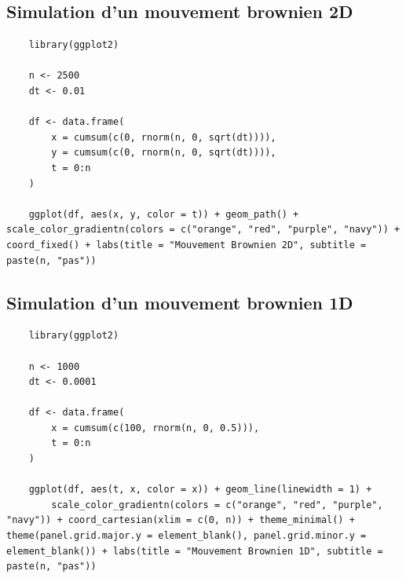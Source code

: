 \subsection*{Simulation d'un mouvement brownien 2D}
\begin{lstlisting}
    library(ggplot2)
    
    n <- 2500
    dt <- 0.01

    df <- data.frame(
        x = cumsum(c(0, rnorm(n, 0, sqrt(dt)))),
        y = cumsum(c(0, rnorm(n, 0, sqrt(dt)))),
        t = 0:n
    )

    ggplot(df, aes(x, y, color = t)) + geom_path() + scale_color_gradientn(colors = c("orange", "red", "purple", "navy")) + coord_fixed() + labs(title = "Mouvement Brownien 2D", subtitle = paste(n, "pas"))
\end{lstlisting}
\pagebreak
\subsection*{Simulation d'un mouvement brownien 1D}
\begin{lstlisting}
    library(ggplot2)
    
    n <- 1000 
    dt <- 0.0001 
    
    df <- data.frame(
        x = cumsum(c(100, rnorm(n, 0, 0.5))),
        t = 0:n
    )
    
    ggplot(df, aes(t, x, color = x)) + geom_line(linewidth = 1) + 
        scale_color_gradientn(colors = c("orange", "red", "purple", "navy")) + coord_cartesian(xlim = c(0, n)) + theme_minimal() + theme(panel.grid.major.y = element_blank(), panel.grid.minor.y = element_blank()) + labs(title = "Mouvement Brownien 1D", subtitle = paste(n, "pas"))
\end{lstlisting}


  